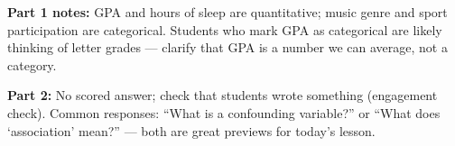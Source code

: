 \documentclass[10pt]{article}
\begin{document}
\vspace{0.2in}

\begin{teachernote}
\textbf{Part 1 notes:} GPA and hours of sleep are quantitative; music genre and sport
participation are categorical. Students who mark GPA as categorical are likely thinking of
letter grades --- clarify that GPA is a number we can average, not a category.

\textbf{Part 2:} No scored answer; check that students wrote something (engagement check).
Common responses: ``What is a confounding variable?'' or ``What does `association' mean?''
--- both are great previews for today's lesson.
\end{teachernote}
\end{document}
